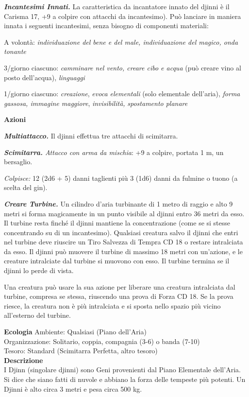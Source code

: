 \begin{multicols}{2}
\emph{\textbf{Incantesimi Innati.}} La caratteristica da incantatore innato del djinni è il Carisma 17, +9 a colpire con attacchi da incantesimo). Può lanciare in maniera innata i seguenti incantesimi, senza bisogno di componenti materiali:

A volontà: \emph{individuazione del bene e del male, individuazione del magico, onda tonante}

3/giorno ciascuno: \emph{camminare nel vento, creare cibo e acqua} (può creare vino al posto dell'acqua), \emph{linguaggi}

1/giorno ciascuno: \emph{creazione}, \emph{evoca elementali} (solo elementale dell'aria), \emph{forma gassosa, immagine maggiore}, \emph{invisibilità,} \emph{spostamento planare}

\textbf{Azioni}

\emph{\textbf{Multiattacco.}} Il djinni effettua tre attacchi di
scimitarra.

\emph{\textbf{Scimitarra.} Attacco con arma da mischia}: +9 a colpire, portata 1 m, un bersaglio.

\emph{Colpisce:} 12 (2d6 + 5) danni taglienti più 3 (1d6) danni da fulmine o tuono (a scelta del gin).

\emph{\textbf{Creare Turbine.}} Un cilindro d'aria turbinante di 1 metro di raggio e alto 9 metri si forma magicamente in un punto visibile al djinni entro 36 metri da esso. Il turbine resta finché il djinni mantiene la concentrazione (come se si stesse concentrando su di un incantesimo). Qualsiasi creatura salvo il djinni che entri nel turbine deve riuscire un Tiro Salvezza di Tempra CD 18 o restare intralciata da esso. Il djinni può muovere il turbine di massimo 18 metri con un'azione, e le creature intralciate dal turbine si muovono con esso. Il turbine termina se il djinni lo perde di vista.

Una creatura può usare la sua azione per liberare una creatura intralciata dal turbine, compresa se stessa, riuscendo una prova di Forza CD 18. Se la prova riesce, la creatura non è più intralciata e si sposta nello spazio più vicino all'esterno del turbine.

\textbf{Ecologia}
Ambiente: Qualsiasi (Piano dell'Aria)\\
Organizzazione: Solitario, coppia, compagnia (3-6) o banda (7-10)\\
Tesoro: Standard (Scimitarra Perfetta, altro tesoro)\\
\textbf{Descrizione}\\
I Djinn (singolare djinni) sono Geni provenienti dal Piano Elementale dell'Aria. Si dice che siano fatti di nuvole e abbiano la forza delle tempeste più potenti. Un Djinni è alto circa 3 metri e pesa circa 500 kg.\\


\end{multicols}

